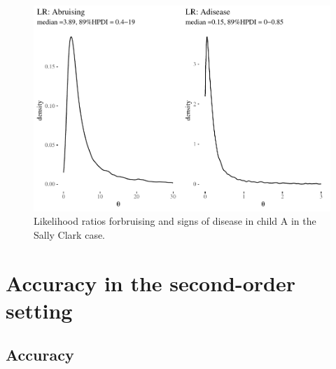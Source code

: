 \documentclass[
  10pt,
  dvipsnames,enabledeprecatedfontcommands]{scrartcl}
\begin{document}
\begin{figure}[H]


\begin{center}\includegraphics[width=0.9\linewidth]{imprecision_philosophical_paper2_files/figure-latex/SClrs-1} \end{center}

\caption{Likelihood ratios forbruising and signs of disease in child A in the Sally Clark case.}
\label{fig:SClrs}

\end{figure}

\hypertarget{accuracy-in-the-second-order-setting}{%
\section{Accuracy in the second-order
setting}\label{accuracy-in-the-second-order-setting}}

\hypertarget{accuracy}{%
\subsection{Accuracy}\label{accuracy}}
\end{document}
